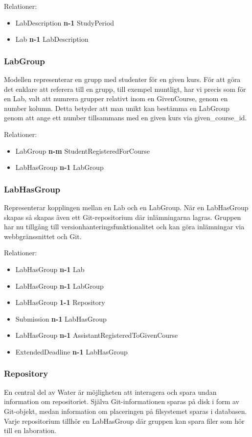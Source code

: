 Relationer: 
\begin{itemize}
  \item LabDescription {\bf n-1} StudyPeriod 
  \item Lab {\bf n-1} LabDescription
\end{itemize}

\subsubsection{LabGroup}
Modellen representerar en grupp med studenter för en given kurs. För att göra det enklare att referera till en grupp, till exempel muntligt, har vi precis som för en Lab, valt att numrera grupper relativt inom en GivenCourse, genom en number kolumn. Detta betyder att man unikt kan bestämma en LabGroup genom att ange ett number tillsammans med en given kurs via given\_course\_id.

Relationer: 
\begin{itemize}
  \item LabGroup {\bf n-m} StudentRegisteredForCourse 
  \item LabHasGroup {\bf n-1} LabGroup
\end{itemize}

\subsubsection{LabHasGroup}\label{sec:modell-labhasgroup}
Representerar kopplingen mellan en Lab och en LabGroup. När en LabHasGroup skapas så skapas även ett Git-repositorium där inlämningarna lagras. Gruppen har nu tillgång till versionhanteringsfunktionalitet och kan göra inlämningar via webbgränssnittet och Git.

Relationer: 
\begin{itemize}
  \item LabHasGroup {\bf n-1} Lab 
  \item LabHasGroup {\bf n-1} LabGroup
  \item LabHasGroup {\bf 1-1} Repository
  \item Submission {\bf n-1} LabHasGroup
  \item LabHasGroup {\bf n-1} AssistantRegisteredToGivenCourse
  \item ExtendedDeadline {\bf n-1} LabHasGroup

\end{itemize}

\subsubsection{Repository}
En central del av Water är möjligheten att interagera och spara undan information om repositoriet. Själva Git-informationen sparas på disk i form av Git-objekt, medan information om placeringen på filsystemet sparas i databasen. Varje repositorium tillhör en LabHasGroup där gruppen kan spara filer som hör till en laboration.


